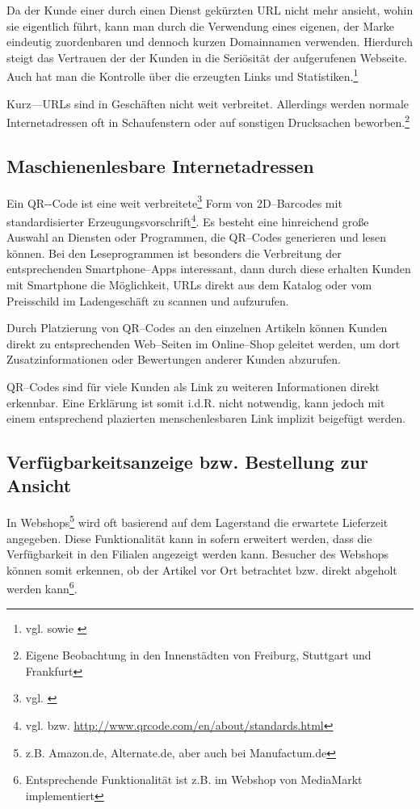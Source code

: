 Da der Kunde einer durch einen Dienst gekürzten \ac{URL} nicht mehr ansieht, wohin sie eigentlich führt, kann man durch die Verwendung eines eigenen, der Marke eindeutig zuordenbaren und dennoch kurzen Domainnamen verwenden. Hierdurch steigt das Vertrauen der der Kunden in die Seriösität der aufgerufenen Webseite. Auch hat man die Kontrolle über die erzeugten Links und Statistiken.\footnote{vgl. \cite{webmag} sowie \cite{gillen}}

Kurz––URLs sind in Geschäften nicht weit verbreitet. Allerdings werden normale Internetadressen oft in Schaufenstern oder auf sonstigen Drucksachen beworben.\footnote{Eigene Beobachtung in den Innenstädten von Freiburg, Stuttgart und Frankfurt}

\subsection{Maschienenlesbare Internetadressen}

Ein \ac{QR--Code} ist eine weit verbreitete\footnote{vgl. \cite{statista:qr}} Form von 2D--Barcodes mit standardisierter Erzeugungsvorschrift\footnote{vgl. \cite{iso:qr} bzw. \url{http://www.qrcode.com/en/about/standards.html}}. Es besteht eine hinreichend große Auswahl an Diensten oder Programmen, die QR--Codes generieren und lesen können. Bei den Leseprogrammen ist besonders die Verbreitung der entsprechenden Smartphone--Apps interessant, dann durch diese erhalten Kunden mit Smartphone die Möglichkeit, \ac{URL}s direkt aus dem Katalog oder vom Preisschild im Ladengeschäft zu scannen und aufzurufen. 

Durch Platzierung von QR--Codes an den einzelnen Artikeln können Kunden direkt zu entsprechenden Web--Seiten im Online--Shop geleitet werden, um dort Zusatzinformationen oder Bewertungen anderer Kunden abzurufen. 

QR--Codes sind für viele Kunden als Link zu weiteren Informationen direkt erkennbar. Eine Erklärung ist somit i.d.R. nicht notwendig, kann jedoch mit einem entsprechend plazierten menschenlesbaren Link implizit beigefügt werden.

\subsection{Verfügbarkeitsanzeige bzw. Bestellung zur Ansicht}

In Webshops\footnote{z.B. Amazon.de, Alternate.de, aber auch bei Manufactum.de} wird oft basierend auf dem Lagerstand die erwartete Lieferzeit angegeben. Diese Funktionalität kann in sofern erweitert werden, dass die Verfügbarkeit in den Filialen angezeigt werden kann. Besucher des Webshops können somit erkennen, ob der Artikel vor Ort betrachtet bzw. direkt abgeholt werden kann\footnote{Entsprechende Funktionalität ist z.B. im Webshop von MediaMarkt implementiert}. 

